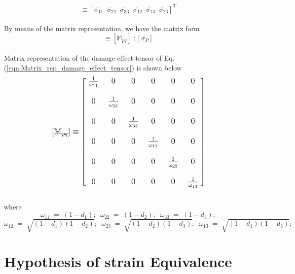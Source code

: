 \documentclass[12pt,openright,twoside]{report}
\begin{document}
\begin{equation}
   [\tilde{\sigma_{P}}]  \equiv  [\tilde{\sigma_{11}} \;\; \tilde{\sigma_{22}} \;\;\tilde{\sigma_{33}} \;\;\tilde{\sigma_{12}} \;\;\tilde{\sigma_{13}} \;\;\tilde{\sigma_{23}} ]^{T}
\end{equation}
\\
By means of the matrix representation, we have the matrix form
\begin{equation}
[\tilde{\sigma_{P}}] \equiv [\mathbb{M}_{pq}]\;: [\sigma_{P}]
\label{eqn:Matrix_rep_damage_effect_tensor}
\end{equation}
\\
Matrix representation of the damage effect tensor of Eq.(\ref{eqn:Matrix_rep_damage_effect_tensor}) is shown below \citep{wang2009three}
\\
$$
\mathlarger{ [\mathbb{M}_{pq}] \equiv   
 \begin{bmatrix}
   \; \frac{1}{\omega_{11}}  \; & 0 \; & 0 \; & 0 \; & 0\; & 0  \;\\
  \\
   \;0\; & \frac{1}{\omega_{22}}\; & 0\; & 0\; & 0\; & 0  \;\\
  \\
  \; 0\; & 0 \; & \frac{1}{\omega_{33}}\; & 0\; & 0\; & 0 \; \\
  \\
   \; 0\; & 0\; & 0\; & \frac{1}{\omega_{12}}\; & 0\; & 0  \;\\
  \\
   \; 0\; & 0\; & 0\; & 0\; & \frac{1}{\omega_{23}}\; & 0  \;\\
  \\
   \; 0\; & 0\; & 0\; & 0\; & 0\; & \frac{1}{\omega_{13}}  \; 
  \\
 \end{bmatrix}}
 \label{Damage_effect_tensor}
 $$
\\
where
$$\omega_{11} \; = \; (1 - d_{1}); \;\;  \omega_{22} \; = \; (1 - d_{2}); \;\; \omega_{33} \; = \; (1 - d_{3});$$ \vspace*{0.1cm} $$\omega_{12} \; = \; \sqrt{(1 - d_{1})(1 - d_{2})};  \;\;\omega_{23} \; = \; \sqrt{(1 - d_{2})(1 - d_{3})}; \;\; \omega_{13} \; = \; \sqrt{(1 - d_{1})(1 - d_{3})};$$

\section{Hypothesis of strain Equivalence}\label{Hypothesis of Strain Equivalence}
\end{document}
